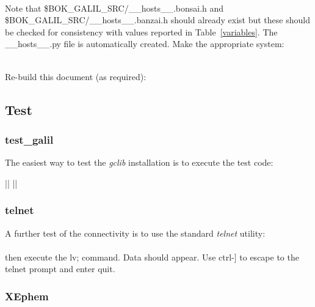 \documentclass[12pt,twoside]{article}
\begin{document}
 \\

\noindent Note that \$BOK\_GALIL\_SRC/\_\_hosts\_\_.bonsai.h and \$BOK\_GALIL\_SRC/\_\_hosts\_\_.banzai.h should already exist 
but these should be checked for consistency with values reported in Table~\ref{variables}. The \_\_hosts\_\_.py file is 
automatically created. Make the appropriate system: \\


 \\

\noindent Re-build this document (as required): \\



\subsection{Test}
\label{tests}

\subsubsection{test\_galil}

The easiest way to test the \emph{gclib} installation is to execute the test code: \\


 ||  ||  \\

\subsubsection{telnet}

A further test of the connectivity is to use the standard \emph{telnet} utility: \\

 \\

\noindent then execute the {\sc lv;} command. Data should appear. Use {\sc ctrl-]} to escape to the telnet prompt and 
enter {\sc quit}.

\subsubsection{XEphem}
\end{document}
